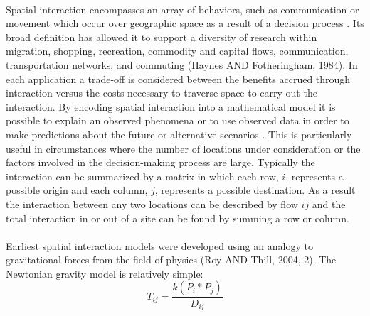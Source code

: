 \documentclass[12pt,a4paper]{thesis}
\begin{document}
\paragraph{}
Spatial interaction encompasses an array of behaviors, such as communication or movement which occur over geographic space as a result of a decision process \citep[1]{FotOke89}. Its broad definition has allowed it to support a diversity of research within migration, shopping, recreation, commodity and capital flows, communication, transportation networks, and commuting (Haynes AND Fotheringham, 1984). In each application a trade-off is considered between the benefits accrued through interaction versus the costs necessary to traverse space to carry out the interaction. By encoding spatial interaction into a mathematical model it is possible to explain an observed phenomena or to use observed data in order to make predictions about the future or alternative scenarios \citep[2]{FotOke89}. This is particularly useful in circumstances where the number of locations under consideration or the factors involved in the decision-making process are large. Typically the interaction can be summarized by a matrix in which each row, $i$,  represents a possible origin and each column, $j$, represents a possible destination. As a result the interaction between any two locations can be described by flow $ij$ and the total interaction in or out of a site can be found by summing a row or column.    
	
\paragraph{}
Earliest spatial interaction models were developed using an analogy to gravitational forces from the field of physics (Roy AND Thill, 2004, 2). The Newtonian gravity model is relatively simple:\\
				\begin{equation}
				T_{ij} = \frac{k(P_{i}*P_{j})}{D_{ij}}
				\label{eq:simpleGrav}
				\end{equation}
				
\end{document}
